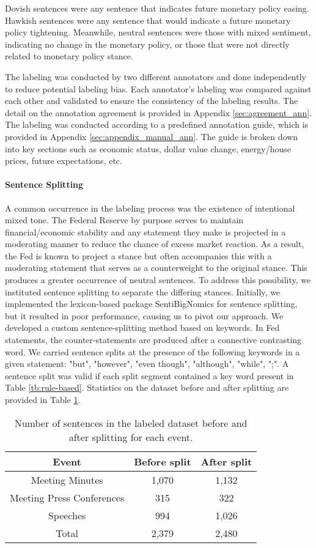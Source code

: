 \documentclass[11pt]{article}
\begin{document}
Dovish sentences were any sentence that indicates future monetary policy easing. Hawkish sentences were any sentence that would indicate a future monetary policy tightening. Meanwhile, neutral sentences were those with mixed sentiment, indicating no change in the monetary policy, or those that were not directly related to monetary policy stance.

The labeling was conducted by two different annotators and done independently to reduce potential labeling bias. Each annotator's labeling was compared against each other and validated to ensure the consistency of the labeling results. The detail on the annotation agreement is provided in Appendix \ref{sec:agreement_ann}. The labeling was conducted according to a predefined annotation guide, which is provided in Appendix \ref{sec:appendix_manual_ann}. The guide is broken down into key sections such as economic status, dollar value change, energy/house prices, future expectations, etc.

\paragraph{Sentence Splitting} A common occurrence in the labeling process was the existence of intentional mixed tone. The Federal Reserve by purpose serves to maintain financial/economic stability and any statement they make is projected in a moderating manner to reduce the chance of excess market reaction. As a result, the Fed is known to project a stance but often accompanies this with a moderating statement that serves as a counterweight to the original stance. This produces a greater occurrence of neutral sentences. To address this possibility, we instituted sentence splitting to separate the differing stances. Initially, we implemented the lexicon-based package SentiBigNomics \citep{SentiBigNomics} for sentence splitting, but it resulted in poor performance, causing us to pivot our approach. We developed a custom sentence-splitting method based on keywords. In Fed statements, the counter-statements are produced after a connective contrasting word. We carried sentence splits at the presence of the following keywords in a given statement: "but", "however", "even though", "although", "while", ";". A sentence split was valid if each split segment contained a key word present in Table \ref{tb:rule-based}. Statistics on the dataset before and after splitting are provided in Table \ref{tb:before_after_split}. 

\begin{table}[h]
\centering
\footnotesize
\begin{tabular}{ccc}
\hline
\textbf{Event} & \textbf{Before split} & \textbf{After split} \\
\hline
Meeting Minutes & 1,070 & 1,132 \\
Meeting Press Conferences & 315 & 322 \\
Speeches & 994 & 1,026  \\
\hline
Total & 2,379 & 2,480\\
\hline
\end{tabular}
\caption{Number of sentences in the labeled dataset before and after splitting for each event. }
\label{tb:before_after_split}
\end{table}
\end{document}
